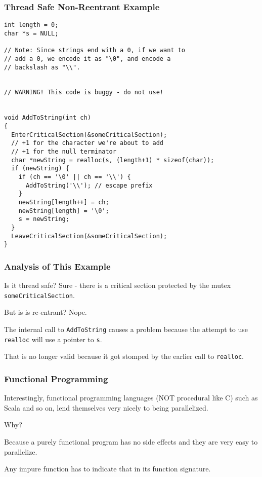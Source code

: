 \begin{frame}[fragile]
\frametitle{Thread Safe Non-Reentrant Example}
{\scriptsize
\begin{verbatim}
int length = 0;
char *s = NULL;

// Note: Since strings end with a 0, if we want to
// add a 0, we encode it as "\0", and encode a
// backslash as "\\".


// WARNING! This code is buggy - do not use!


void AddToString(int ch)
{
  EnterCriticalSection(&someCriticalSection);
  // +1 for the character we're about to add
  // +1 for the null terminator
  char *newString = realloc(s, (length+1) * sizeof(char));
  if (newString) {
    if (ch == '\0' || ch == '\\') {
      AddToString('\\'); // escape prefix
    }
    newString[length++] = ch;
    newString[length] = '\0';
    s = newString;
  }
  LeaveCriticalSection(&someCriticalSection);
}
\end{verbatim}
}


\end{frame}



\begin{frame}
\frametitle{Analysis of This Example}

Is it thread safe? Sure - there is a critical section protected by the mutex \texttt{someCriticalSection}. 

But is is re-entrant? Nope. 

The internal call to \texttt{AddToString} causes a problem because the attempt to use \texttt{realloc} will use a pointer to \texttt{s}.

That is no longer valid because it got stomped by the earlier call to \texttt{realloc}.


\end{frame}



\begin{frame}
\frametitle{Functional Programming}

Interestingly, functional programming languages (NOT procedural like C) such as Scala and so on, lend themselves very nicely to being parallelized. 

Why? 

Because a purely functional program has no side effects and they are very easy to parallelize.

Any impure function has to indicate that in its function signature.

\end{frame}



